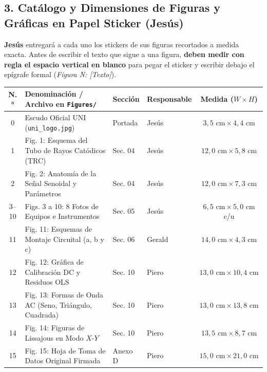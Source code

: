 \documentclass[a4paper, 10pt]{article}
\begin{document}
\vspace{0.1cm}

\subsection*{\color{uni-blue}3. Catálogo y Dimensiones de Figuras y Gráficas en Papel Sticker (Jesús)}
\textbf{Jesús} entregará a cada uno los stickers de sus figuras recortados a medida exacta. Antes de escribir el texto que sigue a una figura, \textbf{deben medir con regla el espacio vertical en blanco} para pegar el sticker y escribir debajo el epígrafe formal (\textit{Figura N: [Texto]}).

\vspace{0.05cm}

\begin{center}
    \footnotesize
    \begin{tabularx}{\linewidth}{@{}clll>{\centering\arraybackslash}c@{}}
        \toprule
        \textbf{N.°} & \textbf{Denominación / Archivo en \texttt{Figures/}} & \textbf{Sección} & \textbf{Responsable} & \textbf{Medida ($W \times H$)} \\
        \midrule
        0 & Escudo Oficial UNI (\texttt{uni\_logo.jpg}) & Portada & Jesús & $3{,}5\text{ cm} \times 4{,}4\text{ cm}$ \\
        1 & Fig. 1: Esquema del Tubo de Rayos Catódicos (TRC) & Sec. 04 & Jesús & $12{,}0\text{ cm} \times 5{,}8\text{ cm}$ \\
        2 & Fig. 2: Anatomía de la Señal Senoidal y Parámetros & Sec. 04 & Jesús & $12{,}0\text{ cm} \times 7{,}3\text{ cm}$ \\
        3--10 & Figs. 3 a 10: 8 Fotos de Equipos e Instrumentos & Sec. 05 & Jesús & $6{,}5\text{ cm} \times 5{,}0\text{ cm}$ c/u \\
        11 & Fig. 11: Esquemas de Montaje Circuital (a, b y c) & Sec. 06 & Gerald & $14{,}0\text{ cm} \times 4{,}3\text{ cm}$ \\
        12 & Fig. 12: Gráfica de Calibración DC y Residuos OLS & Sec. 10 & Piero & $13{,}0\text{ cm} \times 10{,}4\text{ cm}$ \\
        13 & Fig. 13: Formas de Onda AC (Seno, Triángulo, Cuadrada) & Sec. 10 & Piero & $13{,}0\text{ cm} \times 13{,}8\text{ cm}$ \\
        14 & Fig. 14: Figuras de Lissajous en Modo $X$-$Y$ & Sec. 10 & Piero & $13{,}5\text{ cm} \times 8{,}7\text{ cm}$ \\
        15 & Fig. 15: Hoja de Toma de Datos Original Firmada & Anexo D & Piero & $15{,}0\text{ cm} \times 21{,}0\text{ cm}$ \\
        \bottomrule
    \end{tabularx}
\end{center}
\end{document}
